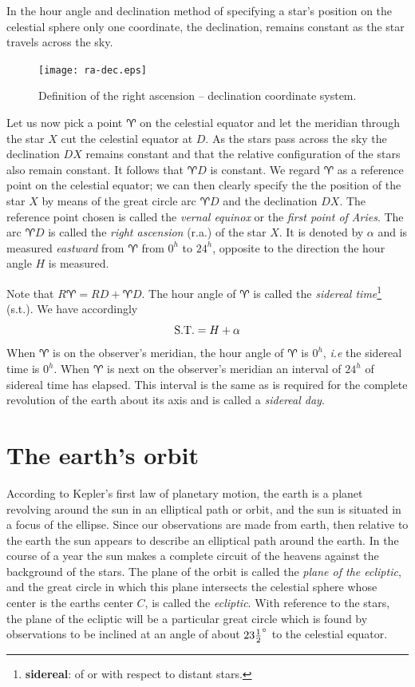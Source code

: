 In the hour angle and declination method of specifying a star's
position on the celestial sphere only one coordinate, the declination,
remains constant as the star travels across the sky. 

\begin{figure}[h]
\centering
\texttt{[image: ra-dec.eps]}
\caption{Definition of the right ascension -- declination coordinate system.}
\label{fig:ra-dec}
\end{figure}

Let us now pick a point $\aries$ on the celestial equator and let the
meridian through the star $X$ cut the celestial equator at $D$. As the
stars pass across the sky the declination $DX$ remains constant and
that the relative configuration of the stars also remain constant. It
follows that $\aries D$ is constant. We regard $\aries$ as a reference
point on the celestial equator; we can then clearly specify the the
position of the star $X$ by means of the great circle arc $\aries D$
and the declination $DX$. The reference point chosen is called the
{\it vernal equinox} or the {\it first point of Aries}. The arc
$\aries D$ is called the {\it right ascension} ({\sc r.a.}) of the
star $X$. It is denoted by $\alpha$ and is measured {\it eastward}
from $\aries$ from $0^h$ to $24^h$, opposite to the direction the hour
angle $H$ is measured. 

Note that $R\aries =RD+\aries D$. The hour angle of $\aries$ is called
the {\it sidereal time}\footnote{{\bf sidereal}: of or with respect to distant stars.} 
 ({\sc s.t.}). We have accordingly 
\[
{\rm S.T.}=H+\alpha
\]
When $\aries$ is on the observer's meridian, the hour angle of
$\aries$ is $0^h$, {\it i.e} the sidereal time is $0^h$. When $\aries$
is next on the observer's meridian an interval of $24^h$ of sidereal
time has elapsed. This interval is the same as is required for the
complete revolution of the earth about its axis and is called a {\it
  sidereal day}. 

\section{The earth's orbit}

According to Kepler's first law of planetary motion, the earth is a 
planet revolving around the sun in an elliptical path or orbit, and
the sun is situated in a focus of the ellipse. Since our observations
are made from earth, then relative to the earth the sun appears to
describe an elliptical path around the earth. In the course of a year
the sun makes a complete circuit of the heavens against the background
of the stars. The plane of the orbit is called the {\it plane of the
  ecliptic},  and the great circle in which this plane intersects the
celestial sphere whose center is the earths center $C$, is called the 
{\it ecliptic}. With reference to the stars, the plane of the ecliptic
will be a particular great circle which is found by observations to be
inclined at an angle of about $23{1\over 2}^\circ$ to the celestial
equator. 

